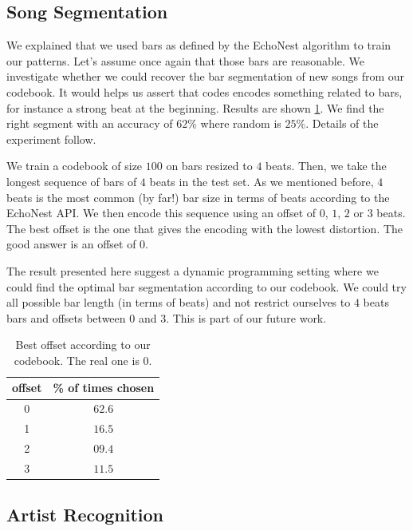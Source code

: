 \documentclass{article}
\begin{document}
\subsection{Song Segmentation} \label{ssec:segment}
We explained that we used bars as defined by the EchoNest algorithm to
train our patterns. Let's assume once again that those bars are
reasonable. We investigate whether we could recover the bar segmentation
of new songs from our codebook. It would helps us assert that codes
encodes something related to bars, for instance a strong beat at the
beginning. Results are shown \ref{tab:offset}. We find the right segment
with an accuracy of $62\%$ where random is $25\%$. Details of the
experiment follow.

We train a codebook of size $100$ on bars resized to $4$ beats. Then,
we take the longest sequence of bars of $4$ beats in the test set.
As we mentioned before, $4$ beats is the most common (by far!) bar size
in terms of beats according to the EchoNest API. We then encode this
sequence using an offset of $0$, $1$, $2$ or $3$ beats. The best offset
is the one that gives the encoding with the lowest distortion. The
good answer is an offset of $0$.

The result presented here suggest a dynamic programming setting where
we could find the optimal bar segmentation according to our codebook. 
We could try
all possible bar length (in terms of beats) and not restrict ourselves
to $4$ beats bars and offsets between $0$ and $3$. This is part of
our future work.

\begin{table}
\begin{center}
\begin{tabular}{c|c}
offset & \% of times chosen \\ \hline
0 & $\mathbf{62.6}$\\
1 & $16.5$\\
2 & $09.4$\\
3 & $11.5$\\
\end{tabular}
\end{center}
\caption{\small{
Best offset according to our codebook. The real one is $0$.
}}
\label{tab:offset}
\end{table}

\subsection{Artist Recognition} \label{ssec:artist}
\end{document}
